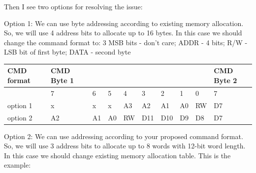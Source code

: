 Then I see two options for resolving the issue:

Option 1:
We can use byte addressing according to existing memory allocation. So, we will use 4 address bits to allocate up to 16 bytes.
In this case we should change the command format to: 3 MSB bits - don't care; ADDR - 4 bits; R/W - LSB bit of first byte; DATA - second byte 

\begin{table}[!ht]
    \centering
    \begin{tabular}{|l|l|l|l|l|l|l|l|l|l|}
    \hline
        CMD format & CMD Byte 1 & ~ & ~ & ~ & ~ & ~ & ~ & ~ & CMD Byte 2 \\ \hline
        ~ & 7 & 6 & 5 & 4 & 3 & 2 & 1 & 0 & 7 \\ \hline
        option 1 & x & x & x & A3 & A2 & A1 & A0 & RW & D7 \\ \hline
        option 2 & A2 & A1 & A0 & RW & D11 & D10 & D9 & D8 & D7 \\ \hline
    \end{tabular}
\end{table}


Option 2:
We can use addressing according to your proposed command format. So, we will use 3 address bits to allocate up to 8 words with 12-bit word length.
In this case we should change existing memory allocation table. This is the example:



